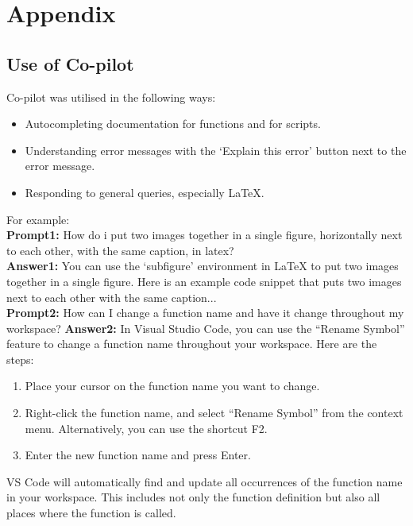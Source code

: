 \documentclass[a4paper,12pt]{article}
\begin{document}
\newpage



\newpage
\section*{Appendix}

\subsection*{Use of Co-pilot}
Co-pilot was utilised in the following ways:
\begin{itemize}
    \item Autocompleting documentation for functions and for scripts.
    \item Understanding error messages with the `Explain this error' button next to the error message.
    \item Responding to general queries, especially LaTeX.
\end{itemize}

\noindent For example: \\
\noindent \textbf{Prompt1:} How do i put two images together in a single figure, horizontally next to each other, with the same caption, in latex? \\
\noindent \textbf{Answer1:} You can use the `subfigure' environment in LaTeX to put two images together in a single figure. Here is an example code snippet that puts two images next to each other with the same caption... \\
\noindent \textbf{Prompt2:} How can I change a function name and have it change throughout my workspace?
\noindent \textbf{Answer2:} In Visual Studio Code, you can use the ``Rename Symbol'' feature to change a function name throughout your workspace. Here are the steps:
\begin{enumerate}
    \item Place your cursor on the function name you want to change.
    \item Right-click the function name, and select ``Rename Symbol'' from the context menu. Alternatively, you can use the shortcut F2.
    \item Enter the new function name and press Enter.
\end{enumerate}
VS Code will automatically find and update all occurrences of the function name in your workspace. This includes not only the function definition but also all places where the function is called.
\end{document}
